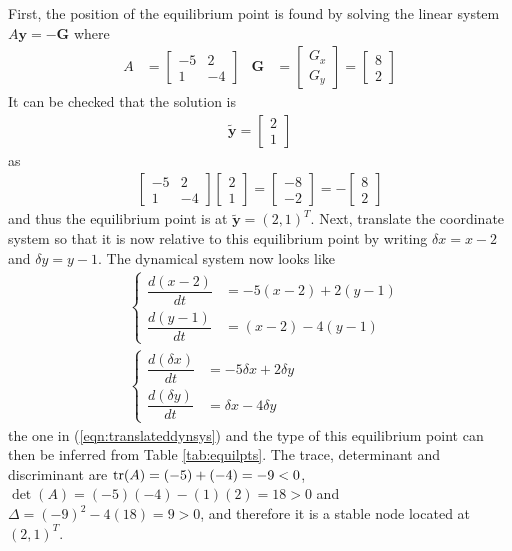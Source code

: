 \begin{solution}
First, the position of the equilibrium point is found by solving the linear system
$A\textbf{y} = -\textbf{G}$ where
\begin{align*}
A &= 
\begin{bmatrix}
-5 & 2 \\
1 & -4
\end{bmatrix}
&
\textbf{G} &= 
\begin{bmatrix}
G_x \\
G_y
\end{bmatrix}
=
\begin{bmatrix}
8 \\
2
\end{bmatrix}
\end{align*}
It can be checked that the solution is
\begin{align*}
\tilde{\textbf{y}} = \begin{bmatrix}
2 \\
1
\end{bmatrix}
\end{align*}
as
\begin{align*}
\begin{bmatrix}
-5 & 2 \\
1 & -4
\end{bmatrix}
\begin{bmatrix}
2 \\
1
\end{bmatrix}
=
\begin{bmatrix}
-8 \\
-2
\end{bmatrix}
=
-\begin{bmatrix}
8 \\
2
\end{bmatrix}
\end{align*}
and thus the equilibrium point is at $\tilde{\textbf{y}} = (2,1)^T$. Next, translate the coordinate system so that it is now relative to this equilibrium point by writing $\delta x = x - 2$ and $\delta y = y - 1$. The dynamical system now looks like
\begin{align*}
&\left\{\begin{alignedat}{1}
\dfrac{d(x-2)}{dt} &= -5(x-2) + 2(y-1) \\
\dfrac{d(y-1)}{dt} &= (x-2) - 4(y-1)
\end{alignedat}\right. \\
&\left\{\begin{alignedat}{1}
\dfrac{d(\delta x)}{dt} &= -5\delta x + 2\delta y \\
\dfrac{d(\delta y)}{dt} &= \delta x - 4\delta y
\end{alignedat}\right.
\end{align*}
the one in (\ref{eqn:translateddynsys}) and the type of this equilibrium point can then be inferred from Table \ref{tab:equilpts}. The trace, determinant and discriminant are $\tr(A) = (-5) + (-4) = -9 < 0$, $\det(A) = (-5)(-4) - (1)(2) = 18 > 0$ and $\Delta = (-9)^2 - 4(18) = 9 > 0$, and therefore it is a stable node located at $(2,1)^T$.
\end{solution}

